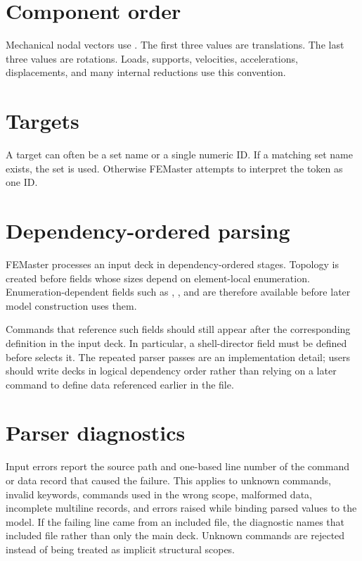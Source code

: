 \section{Component order}

Mechanical nodal vectors use \dofvec. The first three values are translations. The last three values are rotations. Loads, supports, velocities, accelerations, displacements, and many internal reductions use this convention.

\section{Targets}

A target can often be a set name or a single numeric ID. If a matching set name exists, the set is used. Otherwise FEMaster attempts to interpret the token as one ID.

\section{Dependency-ordered parsing}

FEMaster processes an input deck in dependency-ordered stages. Topology is created before fields whose sizes depend on element-local enumeration. Enumeration-dependent fields such as , , and  are therefore available before later model construction uses them.

Commands that reference such fields should still appear after the corresponding  definition in the input deck. In particular, a shell-director field must be defined before  selects it. The repeated parser passes are an implementation detail; users should write decks in logical dependency order rather than relying on a later command to define data referenced earlier in the file.

\section{Parser diagnostics}

Input errors report the source path and one-based line number of the command or data record that caused the failure. This applies to unknown commands, invalid keywords, commands used in the wrong scope, malformed data, incomplete multiline records, and errors raised while binding parsed values to the model. If the failing line came from an included file, the diagnostic names that included file rather than only the main deck. Unknown commands are rejected instead of being treated as implicit structural scopes.

